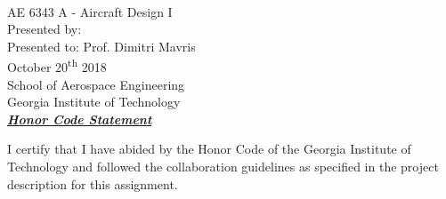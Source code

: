 \makeatletter
{}
\begin{titlepage}
\begin{center}
 \vspace*{0.5in}
 {\Huge\textbf{\@title}} \vspace{0.75in}
 \\
 {\LARGE AE 6343 A - Aircraft Design I} \vspace{1in}
 \\
 {\LARGE Presented by: \studentone} \vspace{0.2in}
 \\
 {\LARGE Presented to: Prof. Dimitri Mavris} \vspace{0.2in}
 \\
 {\LARGE October 20\textsuperscript{th} 2018} \vspace{0.5in}
 \\
 {\LARGE School of Aerospace Engineering \vspace{0.1in} \\ Georgia Institute of Technology}\vspace{1in}
 \\
{\Large \textbf{\underline{\textit{Honor Code Statement}}}}
\end{center}

\noindent
I certify that I have abided by the Honor Code of the Georgia Institute of Technology and followed the collaboration guidelines as specified in the project description for this assignment.\vspace{0.2in}\\

\noindent
\underline{\makebox[3in][l]{}}\\\studentone
\end{titlepage}


\tableofcontents
{}
\listoffigures
{}
\listoftables
{}
\clearpage